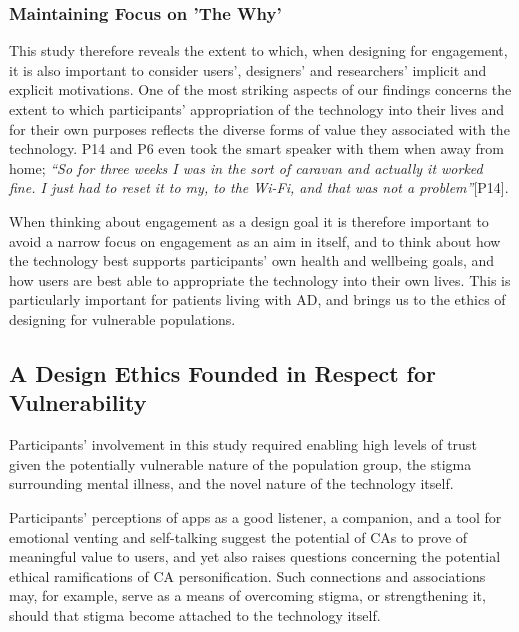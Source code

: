         \subsubsection{Maintaining Focus on 'The Why'}
             
            This study therefore reveals the extent to which, when designing for engagement, it is also important to consider users', designers' and researchers' implicit and explicit motivations. One of the most striking aspects of our findings concerns the extent to which participants' appropriation of the technology into their lives and for their own purposes reflects the diverse forms of value they associated with the technology. P14 and P6 even took the smart speaker with them when away from home; \textit{``So for three weeks I was in the sort of caravan and actually it worked fine. I just had to reset it to my, to the Wi-Fi, and that was not a problem''}[P14].

            When thinking about engagement as a design goal it is therefore important to avoid a narrow focus on engagement as an aim in itself, and to think about how the technology best supports participants' own health and wellbeing goals, and how users are best able to appropriate the technology into their own lives. This is particularly important for patients living with \ac{AD}, and brings us to the ethics of designing for vulnerable populations.

    \subsection{A Design Ethics Founded in Respect for Vulnerability}
    
        Participants' involvement in this study required enabling high levels of trust given the potentially vulnerable nature of the population group, the stigma surrounding mental illness, and the novel nature of the technology itself.
    
        Participants' perceptions of \acp{app} as a good listener, a companion, and a tool for emotional venting and self-talking suggest the potential of \ac{CA}s to prove of meaningful value to users, and yet also raises questions concerning the potential ethical ramifications of \ac{CA} personification. Such connections and associations may, for example, serve as a means of overcoming stigma, or strengthening it, should that stigma become attached to the technology itself. %

